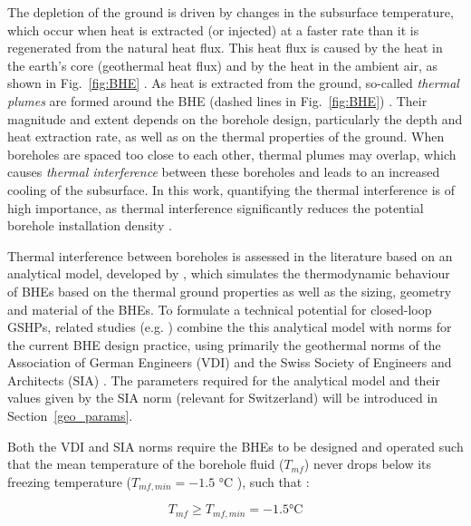 The depletion of the ground is driven by changes in the subsurface temperature, which occur when heat is extracted (or injected) at a faster rate than it is regenerated from the natural heat flux. This heat flux is caused by the heat in the earth's core (geothermal heat flux) and by the heat in the ambient air, as shown in Fig.~\ref{fig:BHE} \cite{wagner_erdsondenpotenzial_2014}.
As heat is extracted from the ground, so-called \textit{thermal plumes} are formed around the BHE (dashed lines in Fig.~\ref{fig:BHE}) \cite{alcaraz_t-i-ger_2017}. Their magnitude and extent depends on the borehole design, particularly the depth and heat extraction rate, as well as on the thermal properties of the ground.
%
When boreholes are spaced too close to each other, thermal plumes may overlap, which causes \textit{thermal interference} between these boreholes and leads to an increased cooling of the subsurface. In this work, quantifying the thermal interference is of high importance, as thermal interference significantly reduces the potential borehole installation density \cite{bayer_geothermal_2019,miglani_methodology_2018}.

Thermal interference between boreholes is assessed in the literature based on an analytical model, developed by \citet{eskilson_thermal_1987}, which simulates the thermodynamic behaviour of BHEs based on the thermal ground properties as well as the sizing, geometry and material of the BHEs.
%
To formulate a technical potential for closed-loop GSHPs, related studies (e.g. \cite{miglani_methodology_2018,rivera_increased_2017,schiel_gis-based_2016,viesi_gis-supported_2018,casasso_g.pot:_2016,perego_techno-economic_2019}) combine the this analytical model with norms for the current BHE design practice, using primarily the geothermal norms of the Association of German Engineers (VDI) \cite{vdi_vdi_2019} and the Swiss Society of Engineers and Architects (SIA) \cite{sia_sondes_2010}.
The parameters required for the analytical model and their values given by the SIA norm (relevant for Switzerland) will be introduced in Section~\ref{geo_params}.

Both the VDI and SIA norms require the BHEs to be designed and operated such that the mean temperature of the borehole fluid ($T_{mf}$) never drops below its freezing temperature ($T_\mathit{mf,min}=-1.5$ °C \cite{sia_sondes_2010}), such that \cite{sia_sondes_2010,vdi_vdi_2019}:

\begin{equation}
\label{eq:T_mf_min}
T_{mf} \geq T_\mathit{mf,min} = -1.5 \text{°C}
\end{equation}

